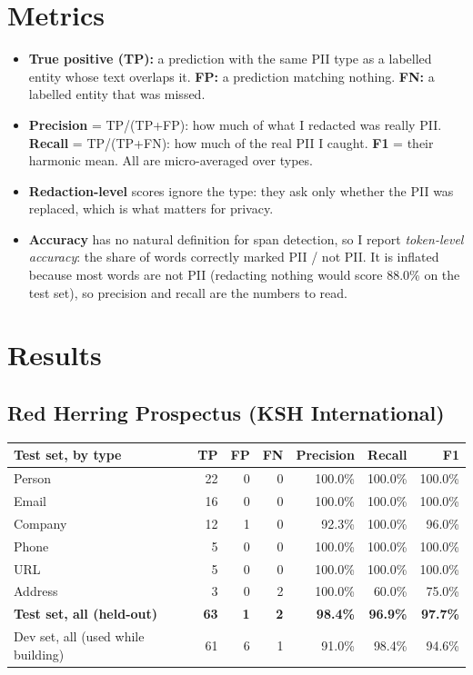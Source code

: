 \documentclass[11pt,a4paper]{article}
\begin{document}
\section{Metrics}
\begin{itemize}
\item \textbf{True positive (TP):} a prediction with the same PII type as a labelled entity whose text overlaps it. \textbf{FP:} a prediction matching nothing. \textbf{FN:} a labelled entity that was missed.
\item \textbf{Precision} = TP/(TP+FP): how much of what I redacted was really PII. \textbf{Recall} = TP/(TP+FN): how much of the real PII I caught. \textbf{F1} = their harmonic mean. All are micro-averaged over types.
\item \textbf{Redaction-level} scores ignore the type: they ask only whether the PII was replaced, which is what matters for privacy.
\item \textbf{Accuracy} has no natural definition for span detection, so I report \emph{token-level accuracy}: the share of words correctly marked PII / not PII. It is inflated because most words are not PII (redacting nothing would score 88.0\% on the test set), so precision and recall are the numbers to read.
\end{itemize}

\section{Results}
\subsection{Red Herring Prospectus (KSH International)}
\begin{tabularx}{\textwidth}{@{}Lrrrrrr@{}}
\toprule
\textbf{Test set, by type} & \textbf{TP} & \textbf{FP} & \textbf{FN} & \textbf{Precision} & \textbf{Recall} & \textbf{F1} \\
\midrule
Person & 22 & 0 & 0 & 100.0\% & 100.0\% & 100.0\% \\
Email & 16 & 0 & 0 & 100.0\% & 100.0\% & 100.0\% \\
Company & 12 & 1 & 0 & 92.3\% & 100.0\% & 96.0\% \\
Phone & 5 & 0 & 0 & 100.0\% & 100.0\% & 100.0\% \\
URL & 5 & 0 & 0 & 100.0\% & 100.0\% & 100.0\% \\
Address & 3 & 0 & 2 & 100.0\% & 60.0\% & 75.0\% \\
\midrule
\textbf{Test set, all (held-out)} & \textbf{63} & \textbf{1} & \textbf{2} & \textbf{98.4\%} & \textbf{96.9\%} & \textbf{97.7\%} \\
Dev set, all (used while building) & 61 & 6 & 1 & 91.0\% & 98.4\% & 94.6\% \\
\bottomrule
\end{tabularx}
\end{document}
